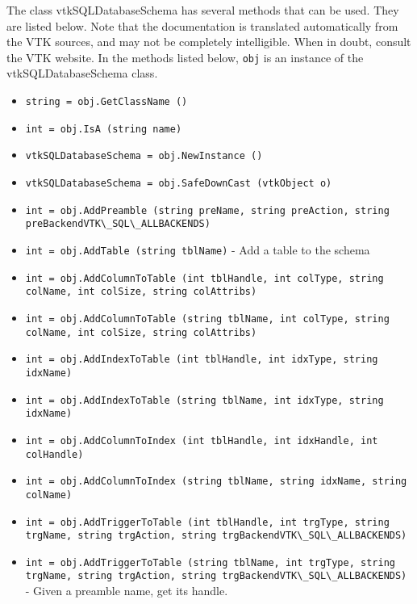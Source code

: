 The class vtkSQLDatabaseSchema has several methods that can be used.
  They are listed below.
Note that the documentation is translated automatically from the VTK sources,
and may not be completely intelligible.  When in doubt, consult the VTK website.
In the methods listed below, \verb|obj| is an instance of the vtkSQLDatabaseSchema class.
\begin{itemize}
\item  \verb|string = obj.GetClassName ()|

\item  \verb|int = obj.IsA (string name)|

\item  \verb|vtkSQLDatabaseSchema = obj.NewInstance ()|

\item  \verb|vtkSQLDatabaseSchema = obj.SafeDownCast (vtkObject o)|

\item  \verb|int = obj.AddPreamble (string preName, string preAction, string preBackendVTK\_SQL\_ALLBACKENDS)|

\item  \verb|int = obj.AddTable (string tblName)| -  Add a table to the schema 

\item  \verb|int = obj.AddColumnToTable (int tblHandle, int colType, string colName, int colSize, string colAttribs)|

\item  \verb|int = obj.AddColumnToTable (string tblName, int colType, string colName, int colSize, string colAttribs)|

\item  \verb|int = obj.AddIndexToTable (int tblHandle, int idxType, string idxName)|

\item  \verb|int = obj.AddIndexToTable (string tblName, int idxType, string idxName)|

\item  \verb|int = obj.AddColumnToIndex (int tblHandle, int idxHandle, int colHandle)|

\item  \verb|int = obj.AddColumnToIndex (string tblName, string idxName, string colName)|

\item  \verb|int = obj.AddTriggerToTable (int tblHandle, int trgType, string trgName, string trgAction, string trgBackendVTK\_SQL\_ALLBACKENDS)|

\item  \verb|int = obj.AddTriggerToTable (string tblName, int trgType, string trgName, string trgAction, string trgBackendVTK\_SQL\_ALLBACKENDS)| -  Given a preamble name, get its handle.


\end{itemize}
